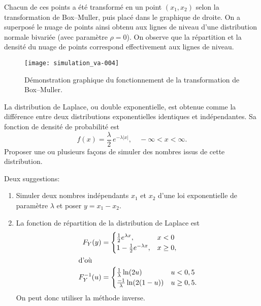 \begin{exercice}
\begin{sol}
    Chacun de ces points a été transformé en un point $(x_1, x_2)$
    selon la transformation de Box--Muller, puis placé dans le
    graphique de droite. On a superposé le nuage de points ainsi
    obtenu aux lignes de niveau d'une distribution normale bivariée
    (avec paramètre $\rho = 0$). On observe que la répartition et la
    densité du nuage de points correspond effectivement aux lignes de
    niveau.
    \begin{figure}
      \centering
\texttt{[image: simulation\_va-004]}
      \caption{Démonstration graphique du fonctionnement de la
        transformation de Box--Muller.}
      \label{fig:simulation:boxmuller}
    \end{figure}
  \end{sol}
\end{exercice}

\begin{exercice}
  La distribution de Laplace, ou double exponentielle, est obtenue
  comme la différence entre deux distributions exponentielles
  identiques et indépendantes. Sa fonction de densité de probabilité
  est
  \begin{displaymath}
    f(x) = \frac{\lambda}{2}\, e^{-\lambda |x|}, \quad
    -\infty < x < \infty.
  \end{displaymath}
  Proposer une ou plusieurs façons de simuler des nombres issus de
  cette distribution.
  \begin{sol}
    Deux suggestions:
    \begin{enumerate}[1.]
    \item Simuler deux nombres indépendants $x_1$ et $x_2$ d'une loi
      exponentielle de paramètre $\lambda$ et poser $y = x_1 - x_2$.
    \item La fonction de répartition de la distribution de Laplace est
      \begin{align*}
        F_{Y}(y)
        &=
        \begin{cases}
          \frac{1}{2}e^{\lambda x}, & x < 0 \\
          1-\frac{1}{2}e^{-\lambda x}, & x \geq 0,
        \end{cases} \\
        \intertext{d'où}
        F_{Y}^{-1}(u)
        &=
        \begin{cases}
          \frac{1}{\lambda} \ln (2u) & u < 0,5 \\
          \frac{-1}{\lambda} \ln (2(1-u) ) & u \geq 0,5.
        \end{cases}
      \end{align*}
      On peut donc utiliser la méthode inverse.
    \end{enumerate}
  \end{sol}
\end{exercice}

